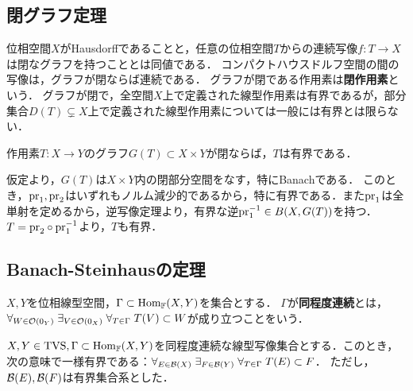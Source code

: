 \documentclass[uplatex,dvipdfmx]{jsreport}
\begin{document}
\subsection{閉グラフ定理}

\begin{tcolorbox}[colframe=ForestGreen, colback=ForestGreen!10!white,breakable,colbacktitle=ForestGreen!40!white,coltitle=black,fonttitle=\bfseries\sffamily,
title=全空間で定義された閉作用素は有界である]
    位相空間$X$がHausdorffであることと，任意の位相空間$T$からの連続写像$f:T\to X$は閉なグラフを持つこととは同値である．
    コンパクトハウスドルフ空間の間の写像は，グラフが閉ならば連続である．
    グラフが閉である作用素は\textbf{閉作用素}という．
    グラフが閉で，全空間$X$上で定義された線型作用素は有界であるが，部分集合$D(T)\subsetneq X$上で定義された線型作用素については一般には有界とは限らない．
\end{tcolorbox}

\begin{theorem}\label{thm-closed-graph-theorem}
    作用素$T:X\to Y$のグラフ$G(T)\subset X\times Y$が閉ならば，$T$は有界である．
\end{theorem}
\begin{Proof}
    仮定より，$G(T)$は$X\times Y$内の閉部分空間をなす，特にBanachである．
    このとき，$\mathrm{pr}_1,\mathrm{pr}_2$はいずれもノルム減少的であるから，特に有界である．また$\mathrm{pr}_1$は全単射を定めるから，逆写像定理より，有界な逆$\mathrm{pr}_1^{-1}\in B(X,G(T))$を持つ．
    $T=\mathrm{pr}_2\circ\mathrm{pr}_1^{-1}$より，$T$も有界．
\end{Proof}

\subsection{Banach-Steinhausの定理}

\begin{definition}
    $X,Y$を位相線型空間，$\Gamma\subset\mathrm{Hom}_{\mathbb{F}}(X,Y)$を集合とする．
    $\Gamma$が\textbf{同程度連続}とは，$\forall_{W\in\mathcal{O}(0_Y)}\;\exists_{V\in\mathcal{O}(0_X)}\;\forall_{T\in\Gamma}\;T(V)\subset W$が成り立つことをいう．
\end{definition}

\begin{theorem}[同程度連続ならば一様有界]
    $X,Y\in\mathrm{TVS},\Gamma\subset\mathrm{Hom}_{\mathbb{F}}(X,Y)$を同程度連続な線型写像集合とする．このとき，次の意味で一様有界である：$\forall_{E\in\mathcal{B}(X)}\;\exists_{F\in\mathcal{B}(Y)}\;\forall_{T\in\Gamma}\;T(E)\subset F$．
    ただし，$\mathcal{B}(E),\mathcal{B}(F)$は有界集合系とした．
\end{theorem}
\end{document}
